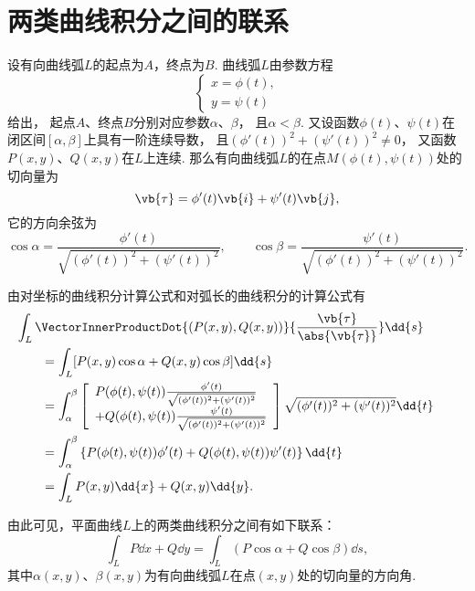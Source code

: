 \section{两类曲线积分之间的联系}
\begingroup
\def\innerProductTau{(\phi'(t))^2+(\psi'(t))^2}%
\def\lenTau{\sqrt{\innerProductTau}}%
\def\fTau#1{\frac{#1}{\lenTau}}%
\def\funcParam{(\phi(t),\psi(t))}%

设有向曲线弧\(L\)的起点为\(A\)，终点为\(B\).
曲线弧\(L\)由参数方程\[
	\begin{cases}
		x = \phi(t), \\
		y = \psi(t)
	\end{cases}
\]给出，
起点\(A\)、终点\(B\)分别对应参数\(\alpha\)、\(\beta\)，
且\(\alpha < \beta\).
又设函数\(\phi(t)\)、\(\psi(t)\)在闭区间\([\alpha,\beta]\)上具有一阶连续导数，
且\(\innerProductTau\neq0\)，
又函数\(P(x,y)\)、\(Q(x,y)\)在\(L\)上连续.
那么有向曲线弧\(L\)的在点\(M(\phi(t),\psi(t))\)处的切向量为\[
	\vb{\tau} = \phi'(t) \vb{i} + \psi'(t) \vb{j},
\]
它的方向余弦为\[
	\cos\alpha
	=\fTau{\phi'(t)},
	\qquad
	\cos\beta
	=\fTau{\psi'(t)}.
\]

由对坐标的曲线积分计算公式和对弧长的曲线积分的计算公式有
\begin{align*}
	&\hspace{-20pt}
	\int_L \VectorInnerProductDot
			{(P(x,y),Q(x,y))}
			{\frac{\vb{\tau}}{\abs{\vb{\tau}}}}
			\dd{s} \\
	&= \int_L [P(x,y)\cos\alpha+Q(x,y)\cos\beta]\dd{s} \\
	&= \int_\alpha^\beta
		\left[
			\begin{array}{l}
				P\funcParam\fTau{\phi'(t)} \\
				+Q\funcParam\fTau{\psi'(t)}
			\end{array}
		\right]
		\lenTau \dd{t} \\
	&= \int_\alpha^\beta \left\{
			P\funcParam\phi'(t) + Q\funcParam\psi'(t)
		\right\} \dd{t} \\
	&= \int_L{P(x,y)\dd{x}+Q(x,y)\dd{y}}.
\end{align*}
\endgroup

由此可见，平面曲线\(L\)上的两类曲线积分之间有如下联系：
\begin{equation}\label{equation:线积分与面积分.平面曲线上两类曲线积分之间的联系}
	\int_L P\dd{x}+Q\dd{y}
	=\int_L (P\cos\alpha+Q\cos\beta)\dd{s},
\end{equation}
其中\(\alpha(x,y)\)、\(\beta(x,y)\)为有向曲线弧\(L\)在点\((x,y)\)处的切向量的方向角.

